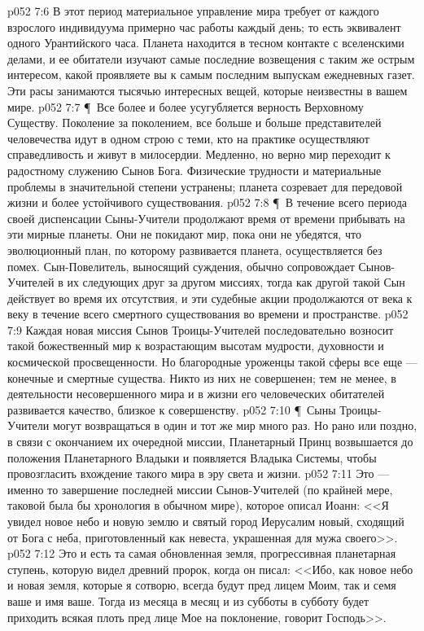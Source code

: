 \vs p052 7:6 В этот период материальное управление мира требует от каждого взрослого индивидуума примерно час работы каждый день; то есть эквивалент одного Урантийского часа. Планета находится в тесном контакте с вселенскими делами, и ее обитатели изучают самые последние возвещения с таким же острым интересом, какой проявляете вы к самым последним выпускам ежедневных газет. Эти расы занимаются тысячью интересных вещей, которые неизвестны в вашем мире.
\vs p052 7:7 \P\ Все более и более усугубляется верность Верховному Существу. Поколение за поколением, все больше и больше представителей человечества идут в одном строю с теми, кто на практике осуществляют справедливость и живут в милосердии. Медленно, но верно мир переходит к радостному служению Сынов Бога. Физические трудности и материальные проблемы в значительной степени устранены; планета созревает для передовой жизни и более устойчивого существования.
\vs p052 7:8 \P\ В течение всего периода своей диспенсации Сыны\hyp{}Учители продолжают время от времени прибывать на эти мирные планеты. Они не покидают мир, пока они не убедятся, что эволюционный план, по которому развивается планета, осуществляется без помех. Сын\hyp{}Повелитель, выносящий суждения, обычно сопровождает Сынов\hyp{}Учителей в их следующих друг за другом миссиях, тогда как другой такой Сын действует во время их отсутствия, и эти судебные акции продолжаются от века к веку в течение всего смертного существования во времени и пространстве.
\vs p052 7:9 Каждая новая миссия Сынов Троицы\hyp{}Учителей последовательно возносит такой божественный мир к возрастающим высотам мудрости, духовности и космической просвещенности. Но благородные уроженцы такой сферы все еще --- конечные и смертные существа. Никто из них не совершенен; тем не менее, в деятельности несовершенного мира и в жизни его человеческих обитателей развивается качество, близкое к совершенству.
\vs p052 7:10 \P\ Сыны Троицы\hyp{}Учители могут возвращаться в один и тот же мир много раз. Но рано или поздно, в связи с окончанием их очередной миссии, Планетарный Принц возвышается до положения Планетарного Владыки и появляется Владыка Системы, чтобы провозгласить вхождение такого мира в эру света и жизни.
\vs p052 7:11 Это --- именно то завершение последней миссии Сынов\hyp{}Учителей (по крайней мере, таковой была бы хронология в обычном мире), которое описал Иоанн: <<Я увидел новое небо и новую землю и святый город Иерусалим новый, сходящий от Бога с неба, приготовленный как невеста, украшенная для мужа своего>>.
\vs p052 7:12 Это и есть та самая обновленная земля, прогрессивная планетарная ступень, которую видел древний пророк, когда он писал: <<Ибо, как новое небо и новая земля, которые я сотворю, всегда будут пред лицем Моим, так и семя ваше и имя ваше. Тогда из месяца в месяц и из субботы в субботу будет приходить всякая плоть пред лице Мое на поклонение, говорит Господь>>.
